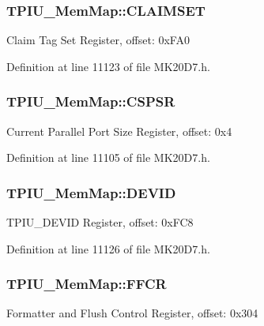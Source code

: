 \subsubsection[{\texorpdfstring{C\+L\+A\+I\+M\+S\+ET}{CLAIMSET}}]{ T\+P\+I\+U\+\_\+\+Mem\+Map\+::\+C\+L\+A\+I\+M\+S\+ET}\hypertarget{struct_t_p_i_u___mem_map_a70bd66aa2144dae3d99cda444fe4110d}{}\label{struct_t_p_i_u___mem_map_a70bd66aa2144dae3d99cda444fe4110d}
Claim Tag Set Register, offset\+: 0x\+F\+A0 

Definition at line 11123 of file M\+K20\+D7.\+h.

\subsubsection[{\texorpdfstring{C\+S\+P\+SR}{CSPSR}}]{ T\+P\+I\+U\+\_\+\+Mem\+Map\+::\+C\+S\+P\+SR}\hypertarget{struct_t_p_i_u___mem_map_a9f8c3b9dcdcb9d2677b661fe2f8a5489}{}\label{struct_t_p_i_u___mem_map_a9f8c3b9dcdcb9d2677b661fe2f8a5489}
Current Parallel Port Size Register, offset\+: 0x4 

Definition at line 11105 of file M\+K20\+D7.\+h.

\subsubsection[{\texorpdfstring{D\+E\+V\+ID}{DEVID}}]{ T\+P\+I\+U\+\_\+\+Mem\+Map\+::\+D\+E\+V\+ID}\hypertarget{struct_t_p_i_u___mem_map_a31752201ff5297f2a82d228387b252c1}{}\label{struct_t_p_i_u___mem_map_a31752201ff5297f2a82d228387b252c1}
T\+P\+I\+U\+\_\+\+D\+E\+V\+ID Register, offset\+: 0x\+F\+C8 

Definition at line 11126 of file M\+K20\+D7.\+h.

\subsubsection[{\texorpdfstring{F\+F\+CR}{FFCR}}]{ T\+P\+I\+U\+\_\+\+Mem\+Map\+::\+F\+F\+CR}\hypertarget{struct_t_p_i_u___mem_map_a34d81bddad51a7dcdbf76548b3809d82}{}\label{struct_t_p_i_u___mem_map_a34d81bddad51a7dcdbf76548b3809d82}
Formatter and Flush Control Register, offset\+: 0x304 

